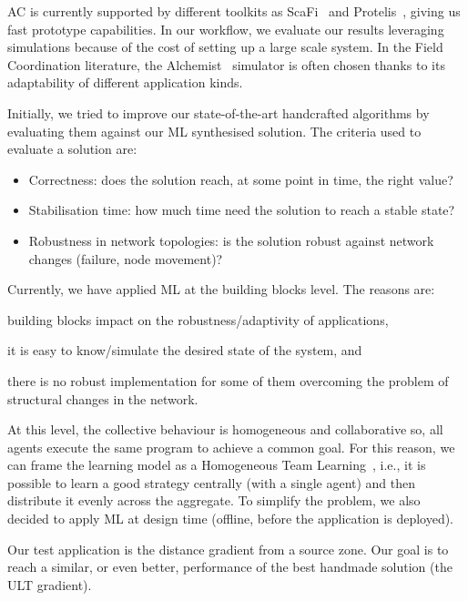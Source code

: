 \documentclass[conference]{IEEEtran}
\begin{document}
AC is currently supported by different toolkits as ScaFi~\cite{DBLP:conf/ecoop/CasadeiV16} and Protelis~\cite{DBLP:conf/sac/PianiniVB15}, giving us fast prototype capabilities.
%
In our workflow, we evaluate our results leveraging simulations because of the cost of setting up a large scale system.
%
In the Field Coordination literature, the Alchemist~\cite{alchemist-jos2013} simulator is often chosen thanks to its adaptability of different application kinds. %

Initially, we tried to improve our state-of-the-art handcrafted algorithms by evaluating them against our ML synthesised solution.
%
The criteria used to evaluate a solution are:
\begin{itemize}
    \item Correctness: does the solution reach, at some point in time, the right value?
    \item Stabilisation time: how much time need the solution to reach a stable state?
    \item Robustness in network topologies: is the solution robust against network changes (failure, node movement)?
\end{itemize}

Currently, we have applied ML at the building blocks level.
The reasons are:
\begin{enumerate*}[label=(\roman*)]
\item building blocks impact on the robustness/adaptivity of applications,
\item it is easy to know/simulate the desired state of the system, and
\item there is no robust implementation for some of them overcoming the problem of structural changes in the network.
\end{enumerate*}
%
At this level, the collective behaviour is homogeneous and collaborative so, all agents execute the same program to achieve a common goal.
%
For this reason, we can frame the learning model as a Homogeneous Team Learning~\cite{DBLP:journals/aamas/PanaitL05}, i.e., it is possible to learn a good strategy centrally (with a single agent) and then distribute it evenly across the aggregate.
%
To simplify the problem, we also decided to apply ML at design time (offline, before the application is deployed).

Our test application is the distance gradient from a source zone. %
%
%
%
Our goal is to reach a similar, or even better, performance of the best handmade solution (the ULT gradient).
\end{document}
